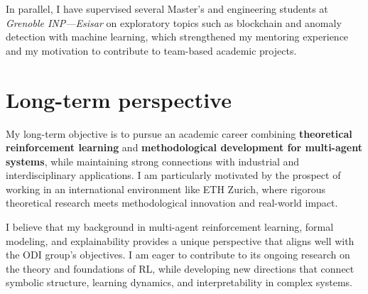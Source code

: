 \documentclass[11pt,a4paper,sans]{moderncv}
\begin{document}
In parallel, I have supervised several Master's and engineering students at \emph{Grenoble INP—Esisar} on exploratory topics such as blockchain and anomaly detection with machine learning, which strengthened my mentoring experience and my motivation to contribute to team-based academic projects.

\section*{Long-term perspective}

My long-term objective is to pursue an academic career combining \textbf{theoretical reinforcement learning} and \textbf{methodological development for multi-agent systems}, while maintaining strong connections with industrial and interdisciplinary applications.
I am particularly motivated by the prospect of working in an international environment like ETH Zurich, where rigorous theoretical research meets methodological innovation and real-world impact.

\vspace{0.5em}
\noindent
I believe that my background in multi-agent reinforcement learning, formal modeling, and explainability provides a unique perspective that aligns well with the ODI group's objectives.
I am eager to contribute to its ongoing research on the theory and foundations of RL, while developing new directions that connect symbolic structure, learning dynamics, and interpretability in complex systems.


\makeletterclosing
\end{document}
